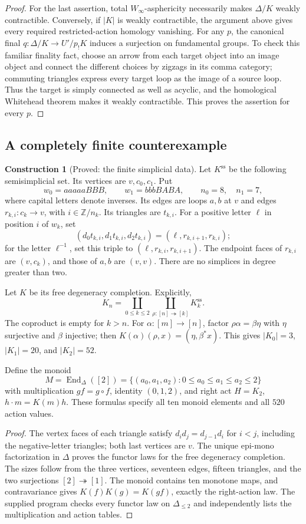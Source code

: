 \documentclass[11pt,a4paper]{article}
\theoremstyle{definition}
\newtheorem{construction}[theorem]{Construction}
\theoremstyle{remark}
\newcommand{\Z}{\mathbb Z}
\newcommand{\Winfty}{W_\infty}
\newcommand{\End}{\operatorname{End}}
\begin{document}
\begin{proof}
For the last assertion, total $\Winfty$-asphericity necessarily makes $\Delta/K$ weakly contractible. Conversely, if $|K|$ is weakly contractible, the argument above gives every required restricted-action homology vanishing. For any $p$, the canonical final $q:\Delta/K\to U'/p_!K$ induces a surjection on fundamental groups. To check this familiar finality fact, choose an arrow from each target object into an image object and connect the different choices by zigzags in its comma category; commuting triangles express every target loop as the image of a source loop. Thus the target is simply connected as well as acyclic, and the homological Whitehead theorem makes it weakly contractible. This proves the assertion for every $p$.
\end{proof}

\subsection{A completely finite counterexample}

\begin{construction}[Proved: the finite simplicial data]\label{A:data}
Let $K^{\mathrm{ss}}$ be the following semisimplicial set. Its vertices are $v,c_0,c_1$. Put
\[
 w_0=aaaaaBBB,\qquad w_1=bbbBABA,\qquad n_0=8,\quad n_1=7,
\]
where capital letters denote inverses. Its edges are loops $a,b$ at $v$ and edges $r_{k,i}:c_k\to v$, with $i\in\Z/n_k$. Its triangles are $t_{k,i}$. For a positive letter $\ell$ in position $i$ of $w_k$, set
\[
 (d_0t_{k,i},d_1t_{k,i},d_2t_{k,i})=(\ell,r_{k,i+1},r_{k,i});
\]
for the letter $\ell^{-1}$, set this triple to $(\ell,r_{k,i},r_{k,i+1})$. The endpoint faces of $r_{k,i}$ are $(v,c_k)$, and those of $a,b$ are $(v,v)$. There are no simplices in degree greater than two.

Let $K$ be its free degeneracy completion. Explicitly,
\[
 K_n=\coprod_{0\leq k\leq2}\coprod_{\rho:[n]\twoheadrightarrow[k]}K_k^{\mathrm{ss}}.
\]
The coproduct is empty for $k>n$. For $\alpha:[m]\to[n]$, factor $\rho\alpha=\beta\eta$ with $\eta$ surjective and $\beta$ injective; then $K(\alpha)(\rho,x)=(\eta,\beta^*x)$. This gives $|K_0|=3$, $|K_1|=20$, and $|K_2|=52$.

Define the monoid
\[
 M=\End_\Delta([2])=\{(a_0,a_1,a_2):0\leq a_0\leq a_1\leq a_2\leq2\}
\]
with multiplication $gf=g\circ f$, identity $(0,1,2)$, and right act $H=K_2$, $h\cdot m=K(m)h$. These formulas specify all ten monoid elements and all $520$ action values.
\end{construction}
\begin{proof}
The vertex faces of each triangle satisfy $d_i d_j=d_{j-1}d_i$ for $i<j$, including the negative-letter triangles; both last vertices are $v$. The unique epi-mono factorization in $\Delta$ proves the functor laws for the free degeneracy completion. The sizes follow from the three vertices, seventeen edges, fifteen triangles, and the two surjections $[2]\twoheadrightarrow[1]$. The monoid contains ten monotone maps, and contravariance gives $K(f)K(g)=K(gf)$, exactly the right-action law. The supplied program checks every functor law on $\Delta_{\leq2}$ and independently lists the multiplication and action tables.
\end{proof}
\end{document}
